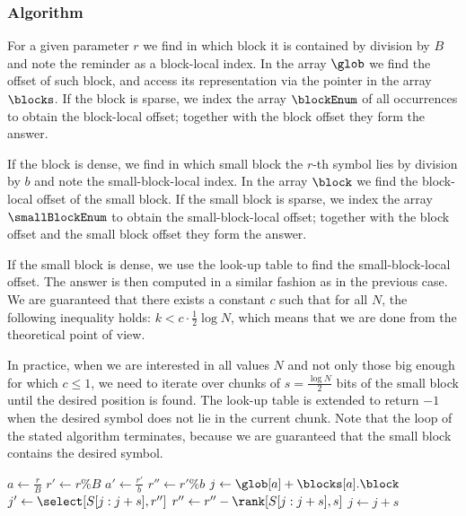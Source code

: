 \subsubsection{Algorithm}

For a given parameter $r$ we find in which block it is contained by division by $B$ and note the reminder as a block-local index.
In the array $\glob$ we find the offset of such block, and access its representation via the pointer in the array $\blocks$.
If the block is sparse, we index the array $\blockEnum$ of all occurrences to obtain the block-local offset; together with the block offset they form the answer.

If the block is dense, we find in which small block the $r$-th symbol \ph{} lies by division by $b$ and note the small-block-local index.
In the array $\block$ we find the block-local offset of the small block.
If the small block is sparse, we index the array $\smallBlockEnum$ to obtain the small-block-local offset; together with the block offset and the small block offset they form the answer.

If the small block is dense, we use the look-up table to find the small-block-local offset.
The answer is then computed in a similar fashion as in the previous case.
We are guaranteed that there exists a constant $c$ such that for all $N$, the following inequality holds: $k < c \cdot \frac{1}{2} \log N$, which means that we are done from the theoretical point of view.

In practice, when we are interested in all values $N$ and not only those big enough for which $c \le 1$, we need to iterate over chunks of $s = \frac{\log N}{2}$ bits of the small block until the desired position is found.
The look-up table is extended to return $-1$ when the desired symbol does not lie in the current chunk.
Note that the loop of the stated algorithm terminates, because we are guaranteed that the small block contains the desired symbol.

\begin{algorithm}
\begin{algorithmic}
	\State $a \gets \frac{r}{B}$%
	\Instr $r' \gets r \% B$
		\State {}
	\Else
		\State $a' \gets \frac{r'}{b}$%
		\Instr $r'' \gets r' \% b$
		\State $j \gets \glob[a] + \blocks[a].\block$
			\State {}
		\Else
			\While{$\true$}
				\State $j' \gets \select[S[j : j + s], r'']$
					\State $r'' \gets r'' - \rank[S[j : j + s], s]$
					\State $j \gets j + s$
				\Else
					\State {}
				\EndIf
			\EndWhile
		\EndIf
	\EndIf
\EndFunction
\end{algorithmic}
\end{algorithm}

